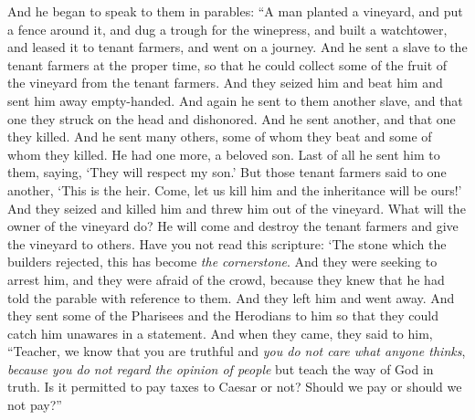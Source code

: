 \begin{biblechapter} %
 And he began to speak to them in parables: “A man planted a vineyard, and put a fence around it, and dug a trough for the winepress, and built a watchtower, and leased it to tenant farmers, and went on a journey.
\verse And he sent a slave to the tenant farmers at the proper time, so that he could collect some of the fruit of the vineyard from the tenant farmers.
\verse And they seized him and beat him and sent him away empty-handed.
\verse And again he sent to them another slave, and that one they struck on the head and dishonored.
\verse And he sent another, and that one they killed. And he sent many others, some of whom they beat and some of whom they killed.
\verse He had one more, a beloved son. Last of all he sent him to them, saying, ‘They will respect my son.’
\verse But those tenant farmers said to one another, ‘This is the heir. Come, let us kill him and the inheritance will be ours!’
\verse And they seized and killed him and threw him out of the vineyard.
\verse What will the owner of the vineyard do? He will come and destroy the tenant farmers and give the vineyard to others.
\verse Have you not read this scripture:
\verse ‘The stone which the builders rejected, 
this has become \textit{the cornerstone}.
\verse And they were seeking to arrest him, and they were afraid of the crowd, because they knew that he had told the parable with reference to them. And they left him and went away.
 And they sent some of the Pharisees and the Herodians to him so that they could catch him unawares in a statement.
\verse And when they came, they said to him, “Teacher, we know that you are truthful and \textit{you do not care what anyone thinks}, \textit{because you do not regard the opinion of people} but teach the way of God in truth. Is it permitted to pay taxes to Caesar or not? Should we pay or should we not pay?”

\end{biblechapter}
